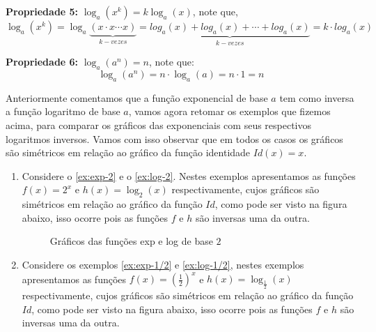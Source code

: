   \textbf{Propriedade 5:} $\log_{a}(x^k)= k \log_{a}(x)$, note que,
  \[\log_{a}(x^k)= \log_{a}\underbrace{(x \cdot x \cdots x)}_{k-vezes}= \underbrace{log_{a}(x) + log_{a}(x)+ \cdots + log_{a}(x)}_{k-vezes}= k \cdot log_{a}(x)\]
  \fim

  \textbf{Propriedade 6:} $\log_{a}(a^n)= n$, note que:
  \[\log_{a}(a^n)= n \cdot \log_{a}(a)= n \cdot 1 = n\]
  \fim

  Anteriormente comentamos que a função exponencial de base $a$ tem como inversa a função logaritmo de base $a$, vamos agora retomar os exemplos que fizemos acima, para comparar os gráficos das exponenciais com seus respectivos logaritmos inversos. Vamos com isso observar que em todos os casos os gráficos são simétricos em relação ao gráfico da função identidade $Id(x)= x$.

  \begin{enumerate}
   \item Considere o \autoref{ex:exp-2} e o \autoref{ex:log-2}. Nestes exemplos apresentamos as funções $f(x)= 2^x$ e $h(x)= \log_{2}(x)$ respectivamente, cujos gráficos são simétricos em relação ao gráfico da função $Id$, como pode ser visto na figura abaixo, isso ocorre pois as funções $f$ e $h$ são inversas uma da outra.

   \begin{figure}[H]
    \centering
    \caption{Gráficos das funções exp e log de base $2$}
   \end{figure}

   \item Considere os exemplos \autoref{ex:exp-1/2} e \autoref{ex:log-1/2}, nestes exemplos apresentamos as funções $f(x)= \left(\frac{1}{2}\right)^x$ e $h(x)= \log_{\frac{1}{2}}(x)$ respectivamente, cujos gráficos são simétricos em relação ao gráfico da função $Id$, como pode ser visto na figura abaixo, isso ocorre pois as funções $f$ e $h$ são inversas uma da outra.


\end{enumerate}
